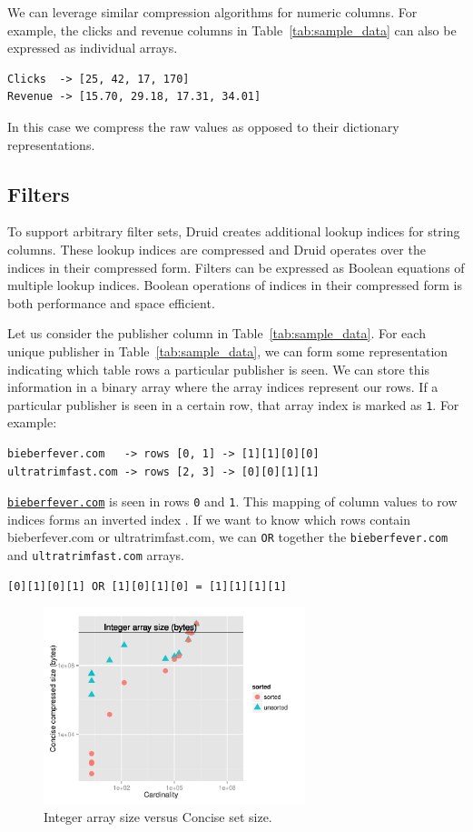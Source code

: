 \documentclass{vldb}
\begin{document}
We can leverage similar compression algorithms for numeric
columns. For example, the clicks and revenue columns in
Table~\ref{tab:sample_data} can also be expressed as individual
arrays.
\begin{verbatim}
Clicks  -> [25, 42, 17, 170]
Revenue -> [15.70, 29.18, 17.31, 34.01]
\end{verbatim}
In this case we compress the raw values as opposed to their dictionary
representations.

\subsection{Filters}
To support arbitrary filter sets, Druid creates additional lookup
indices for string columns. These lookup indices are compressed and
Druid operates over the indices in their compressed form. Filters can
be expressed as Boolean equations of multiple lookup indices. Boolean
operations of indices in their compressed form is both performance and
space efficient.

Let us consider the publisher column in
Table~\ref{tab:sample_data}. For each unique publisher in
Table~\ref{tab:sample_data}, we can form some representation
indicating which table rows a particular publisher is seen. We can
store this information in a binary array where the array indices
represent our rows. If a particular publisher is seen in a certain
row, that array index is marked as \texttt{1}. For example:
\begin{verbatim}
bieberfever.com   -> rows [0, 1] -> [1][1][0][0]
ultratrimfast.com -> rows [2, 3] -> [0][0][1][1]
\end{verbatim}

\texttt{\href{http://bieberfever.com}{bieberfever.com}} is seen in rows \texttt{0} and \texttt{1}. This mapping of column values
to row indices forms an inverted index \cite{tomasic1993performance}. If we want to know which
rows contain {\ttfamily bieberfever.com} or {\ttfamily ultratrimfast.com}, we can \texttt{OR} together
the \texttt{bieberfever.com} and \texttt{ultratrimfast.com} arrays.
\begin{verbatim}
[0][1][0][1] OR [1][0][1][0] = [1][1][1][1]
\end{verbatim}

\begin{figure}
\centering
\includegraphics[width = 3in]{concise_plot}
\caption{Integer array size versus Concise set size.}
\label{fig:concise_plot}
\end{figure}
\end{document}
